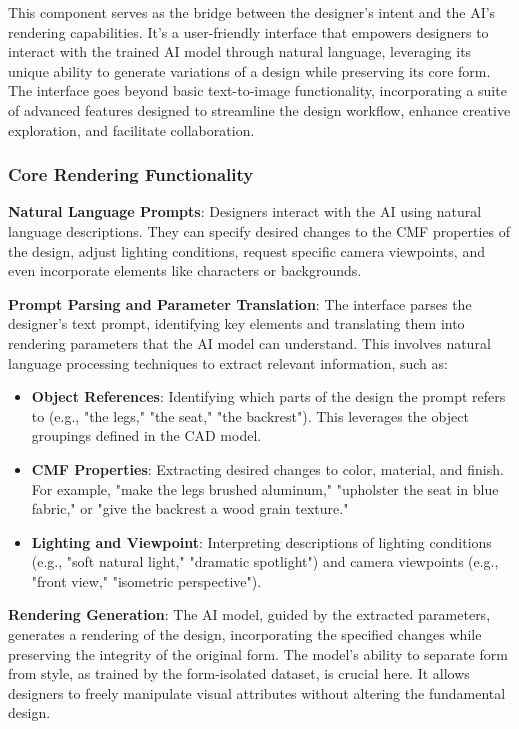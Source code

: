\documentclass{article}
\begin{document}
\begin{itemize}
This component serves as the bridge between the designer's intent and the AI's rendering capabilities. It's a user-friendly interface that empowers designers to interact with the trained AI model through natural language, leveraging its unique ability to generate variations of a design while preserving its core form. The interface goes beyond basic text-to-image functionality, incorporating a suite of advanced features designed to streamline the design workflow, enhance creative exploration, and facilitate collaboration.

\subsubsection{Core Rendering Functionality}

\textbf{Natural Language Prompts}: Designers interact with the AI using natural language descriptions. They can specify desired changes to the CMF properties of the design, adjust lighting conditions, request specific camera viewpoints, and even incorporate elements like characters or backgrounds.

\textbf{Prompt Parsing and Parameter Translation}: The interface parses the designer's text prompt, identifying key elements and translating them into rendering parameters that the AI model can understand. This involves natural language processing techniques to extract relevant information, such as:

\begin{itemize}
    \item \textbf{Object References}: Identifying which parts of the design the prompt refers to (e.g., "the legs," "the seat," "the backrest"). This leverages the object groupings defined in the CAD model.
    \item \textbf{CMF Properties}: Extracting desired changes to color, material, and finish. For example, "make the legs brushed aluminum," "upholster the seat in blue fabric," or "give the backrest a wood grain texture."
    \item \textbf{Lighting and Viewpoint}: Interpreting descriptions of lighting conditions (e.g., "soft natural light," "dramatic spotlight") and camera viewpoints (e.g., "front view," "isometric perspective").
\end{itemize}

\textbf{Rendering Generation}: The AI model, guided by the extracted parameters, generates a rendering of the design, incorporating the specified changes while preserving the integrity of the original form. The model's ability to separate form from style, as trained by the form-isolated dataset, is crucial here. It allows designers to freely manipulate visual attributes without altering the fundamental design.


\end{itemize}
\end{document}
